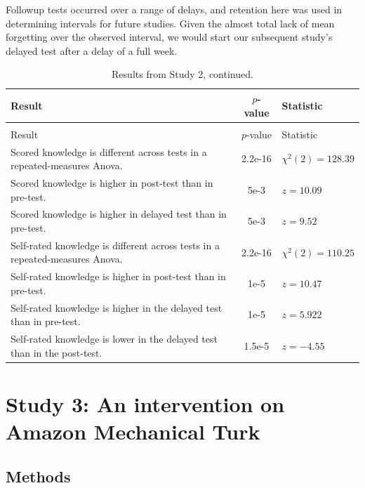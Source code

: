 Followup tests occurred over a range of
delays, and retention here was used in determining intervals for future studies.
Given the almost total lack of mean forgetting over the observed interval, we
would start our subsequent study's delayed test after a delay of a full week.



\begin{longtabu}{X[2.5]S[table-parse-only]X[l]}

\caption{Results from Study 2.\label{table:RPP-mech-results}}\\ 
\toprule
Result & {$p$-value} & Statistic \\ \midrule
\endfirsthead

\caption[]{Results from Study 2, continued.}\\
\toprule
Result & {$p$-value} & Statistic \\ \midrule
\endhead

\bottomrule
\endfoot

Scored knowledge is different across tests in a repeated-measures Anova. &
2.2e-16 & $\chi^2(2)=128.39$  \\
Scored knowledge is higher in post-test than in pre-test. & 5e-3 & $z=10.09$ \\
Scored knowledge is higher in delayed test than in pre-test. & 5e-3 & $z=9.52$ \\
Self-rated knowledge is different across tests in a repeated-measures Anova. &
2.2e-16 & $\chi^2(2)=110.25$ \\
Self-rated knowledge is higher in post-test than in pre-test. & 1e-5 & $z=10.47$ \\
Self-rated knowledge is higher in the delayed test than in pre-test. & 1e-5 &
$z=5.922$ \\
Self-rated knowledge is lower in the delayed test than in the post-test. &
1.5e-5 & $z=-4.55$ \\

\end{longtabu}

\section{Study 3: An intervention on Amazon Mechanical Turk}

\subsection{Methods}

